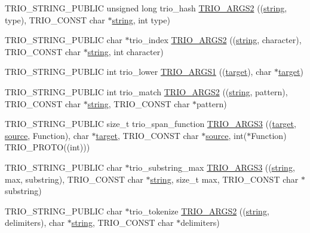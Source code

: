 \begin{DoxyCompactItemize}
\item 
T\+R\+I\+O\+\_\+\+S\+T\+R\+I\+N\+G\+\_\+\+P\+U\+B\+L\+IC unsigned long trio\+\_\+hash \hyperlink{group___static_strings_gae2608609cc3be97312c66c7a1f00695f}{T\+R\+I\+O\+\_\+\+A\+R\+G\+S2} ((\hyperlink{structstring}{string}, type), T\+R\+I\+O\+\_\+\+C\+O\+N\+ST char $\ast$\hyperlink{structstring}{string}, int type)
\item 
T\+R\+I\+O\+\_\+\+S\+T\+R\+I\+N\+G\+\_\+\+P\+U\+B\+L\+IC char $\ast$trio\+\_\+index \hyperlink{group___static_strings_ga76aed1ea3034810e6f5c34af6a7157f8}{T\+R\+I\+O\+\_\+\+A\+R\+G\+S2} ((\hyperlink{structstring}{string}, character), T\+R\+I\+O\+\_\+\+C\+O\+N\+ST char $\ast$\hyperlink{structstring}{string}, int character)
\item 
T\+R\+I\+O\+\_\+\+S\+T\+R\+I\+N\+G\+\_\+\+P\+U\+B\+L\+IC int trio\+\_\+lower \hyperlink{group___static_strings_ga34c516423e630947655bda9817c62003}{T\+R\+I\+O\+\_\+\+A\+R\+G\+S1} ((\hyperlink{interfacevoid}{target}), char $\ast$\hyperlink{interfacevoid}{target})
\item 
T\+R\+I\+O\+\_\+\+S\+T\+R\+I\+N\+G\+\_\+\+P\+U\+B\+L\+IC int trio\+\_\+match \hyperlink{group___static_strings_gad46d4eed421ae795fd20aa9f64906d46}{T\+R\+I\+O\+\_\+\+A\+R\+G\+S2} ((\hyperlink{structstring}{string}, pattern), T\+R\+I\+O\+\_\+\+C\+O\+N\+ST char $\ast$\hyperlink{structstring}{string}, T\+R\+I\+O\+\_\+\+C\+O\+N\+ST char $\ast$pattern)
\item 
T\+R\+I\+O\+\_\+\+S\+T\+R\+I\+N\+G\+\_\+\+P\+U\+B\+L\+IC size\+\_\+t trio\+\_\+span\+\_\+function \hyperlink{group___static_strings_ga78d6885ae5ffadf874d112338d776ecd}{T\+R\+I\+O\+\_\+\+A\+R\+G\+S3} ((\hyperlink{interfacevoid}{target}, \hyperlink{structsource}{source}, Function), char $\ast$\hyperlink{interfacevoid}{target}, T\+R\+I\+O\+\_\+\+C\+O\+N\+ST char $\ast$\hyperlink{structsource}{source}, int($\ast$Function) T\+R\+I\+O\+\_\+\+P\+R\+O\+TO((int)))
\item 
T\+R\+I\+O\+\_\+\+S\+T\+R\+I\+N\+G\+\_\+\+P\+U\+B\+L\+IC char $\ast$trio\+\_\+substring\+\_\+max \hyperlink{group___static_strings_gaa02deea0cfa376ec1b2f726615009d96}{T\+R\+I\+O\+\_\+\+A\+R\+G\+S3} ((\hyperlink{structstring}{string}, max, substring), T\+R\+I\+O\+\_\+\+C\+O\+N\+ST char $\ast$\hyperlink{structstring}{string}, size\+\_\+t max, T\+R\+I\+O\+\_\+\+C\+O\+N\+ST char $\ast$substring)
\item 
T\+R\+I\+O\+\_\+\+S\+T\+R\+I\+N\+G\+\_\+\+P\+U\+B\+L\+IC char $\ast$trio\+\_\+tokenize \hyperlink{group___static_strings_ga8bf1d32e8a87f8c13ee53d3c91498176}{T\+R\+I\+O\+\_\+\+A\+R\+G\+S2} ((\hyperlink{structstring}{string}, delimiters), char $\ast$\hyperlink{structstring}{string}, T\+R\+I\+O\+\_\+\+C\+O\+N\+ST char $\ast$delimiters)

\end{DoxyCompactItemize}

